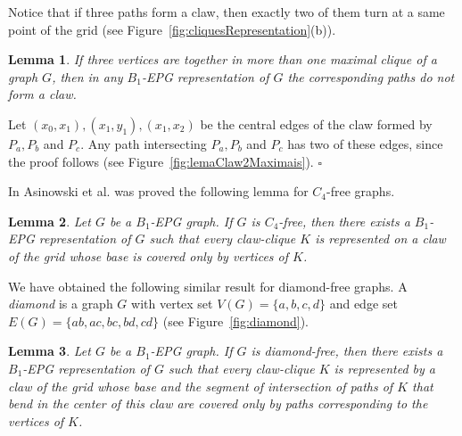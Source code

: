 \documentclass[9pt]{entcs}
\newtheorem{lema}{Lemma}[section]
\begin{document}
    

Notice that if three paths form a claw, then exactly two of them turn at a same
point of the grid (see Figure~\ref{fig:cliquesRepresentation}(b)). %

\begin{lema}\label{lem:cliquesMaximais}
If three vertices are together  in more than one maximal clique of a graph $G$, then in
any $B_1$-EPG representation of $G$ the corresponding paths do not form a claw.
\end{lema}

\begin{pf}
Let $(x_0,x_1), (x_1,y_1), (x_1,x_2) $ be the central edges of the claw formed by $P_a, P_b$ and $P_c$. Any path intersecting $P_a, P_b$ and $P_c$ has two of these edges, since the proof follows (see Figure~\ref{fig:lemaClaw2Maximais}).
 $\square$\end{pf} 



In Asinowski et al. \cite{ries2009} was proved the following lemma for $C_4$-free graphs.

\begin{lema} \cite{ries2009} \label{lem:lemaBRies2009}
Let $G$ be a $B_1$-EPG graph. If $G$ is $C_4$-free, then there exists a $B_1$-EPG representation of $G$ such that every claw-clique $K$ is represented on a claw of the grid whose base is covered only by vertices of $K$.
\end{lema}


We have obtained the following similar result for diamond-free graphs. A \textit{diamond} is a graph $G$ with vertex set $V(G) = \{a, b, c, d\}$ and edge set $E(G)=\{ab, ac,bc, bd,cd\}$ (see Figure~\ref{fig:diamond}). %



\begin{lema}\label{lem:b1epgDiamondFree}
Let $G$ be a $B_1$-EPG graph. If $G$ is diamond-free, then there exists a $B_1$-EPG representation of $G$ such that every claw-clique $K$ is represented by a claw of the grid whose base and the segment of intersection of paths of $K$ that bend in the center of this claw are covered only by paths corresponding to the vertices of $K$. 
\end{lema}
\end{document}
